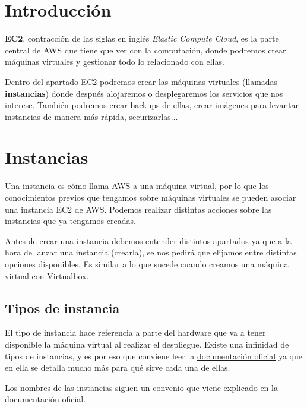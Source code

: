 \chapter{Introducción}

\textbf{EC2}, contracción de las siglas en inglés \textit{Elastic Compute Cloud}, es la parte central de AWS que tiene que ver con la computación, donde podremos crear máquinas virtuales y gestionar todo lo relacionado con ellas.

Dentro del apartado EC2 podremos crear las máquinas virtuales (llamadas \textbf{instancias}) donde después alojaremos o desplegaremos los servicios que nos interese. También podremos crear backups de ellas, crear imágenes para levantar instancias de manera más rápida, securizarlas...

\chapter{Instancias}

Una instancia es cómo llama AWS a una máquina virtual, por lo que los conocimientos previos que tengamos sobre máquinas virtuales se pueden asociar una instancia EC2 de AWS. Podemos realizar distintas acciones sobre las instancias que ya tengamos creadas.

Antes de crear una instancia debemos entender distintos apartados ya que a la hora de lanzar una instancia (crearla), se nos pedirá que elijamos entre distintas opciones disponibles. Es similar a lo que sucede cuando creamos una máquina virtual con Virtualbox.

\section{Tipos de instancia}

El tipo de instancia hace referencia a parte del hardware que va a tener disponible la máquina virtual al realizar el despliegue. Existe una infinidad de tipos de instancias, y es por eso que conviene leer la \href{https://docs.aws.amazon.com/AWSEC2/latest/UserGuide/instance-types.html#AvailableInstanceTypes}{documentación oficial} ya que en ella se detalla mucho más para qué sirve cada una de ellas.

Los nombres de las instancias siguen un convenio que viene explicado en la documentación oficial.

\begin{center}
	
\end{center}

